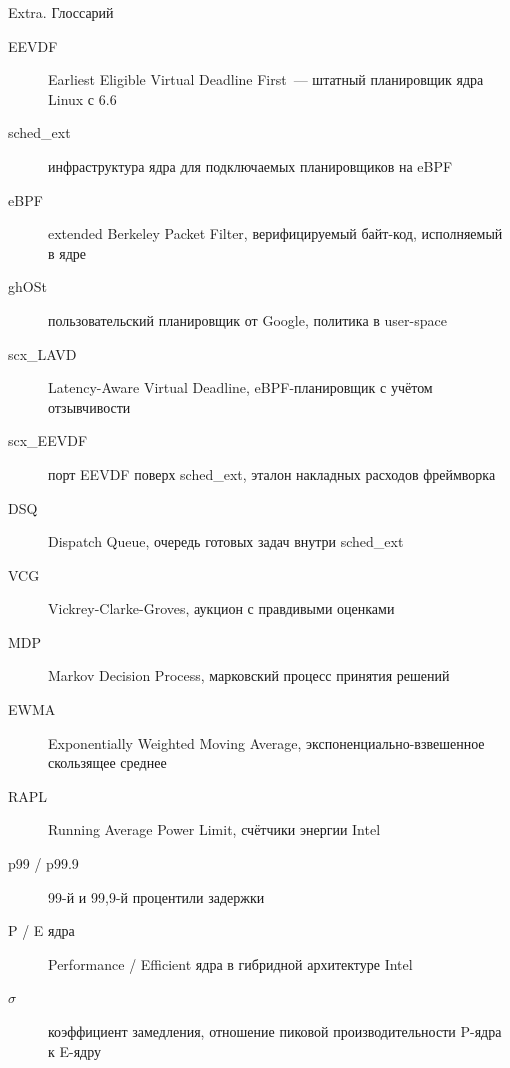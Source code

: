 \documentclass[aspectratio=169,11pt]{beamer}
\begin{document}
\begin{frame}{Extra. Глоссарий}
        \scriptsize
        \begin{description}
                \item[EEVDF] Earliest Eligible Virtual Deadline First~--- штатный
                        планировщик ядра Linux с 6.6
                \item[sched\_ext] инфраструктура ядра для подключаемых
                        планировщиков на eBPF
                \item[eBPF] extended Berkeley Packet Filter, верифицируемый
                        байт-код, исполняемый в ядре
                \item[ghOSt] пользовательский планировщик от Google,
                        политика в user-space
                \item[scx\_LAVD] Latency-Aware Virtual Deadline, eBPF-планировщик
                        с учётом отзывчивости
                \item[scx\_EEVDF] порт EEVDF поверх sched\_ext, эталон накладных
                        расходов фреймворка
                \item[DSQ] Dispatch Queue, очередь готовых задач внутри sched\_ext
                \item[VCG] Vickrey-Clarke-Groves, аукцион с правдивыми оценками
                \item[MDP] Markov Decision Process, марковский процесс принятия
                        решений
                \item[EWMA] Exponentially Weighted Moving Average,
                        экспоненциально-взвешенное скользящее среднее
                \item[RAPL] Running Average Power Limit, счётчики энергии Intel
                \item[p99 / p99.9] 99-й и 99{,}9-й процентили задержки
                \item[P / E ядра] Performance / Efficient ядра в гибридной
                        архитектуре Intel
                \item[$\sigma$] коэффициент замедления, отношение пиковой
                        производительности P-ядра к E-ядру
        \end{description}
\end{frame}
\addtocounter{framenumber}{-1}
\end{document}
